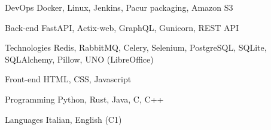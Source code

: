 

\begin{cvskills}

  \cvskill
    {DevOps} %
    {Docker, Linux, Jenkins, Pacur packaging, Amazon S3} %

  \cvskill
    {Back-end} %
    {FastAPI, Actix-web, GraphQL, Gunicorn, REST API} %

\cvskill
	{Technologies} %
	{Redis, RabbitMQ, Celery, Selenium, PostgreSQL, SQLite, 
	SQLAlchemy, Pillow, UNO (LibreOffice)} %


  \cvskill
    {Front-end} %
    {HTML, CSS, Javascript} %

  \cvskill
    {Programming} %
    {Python, Rust, Java, C, C++} %

  \cvskill
    {Languages} %
    {Italian, English (C1)} %

\end{cvskills}
